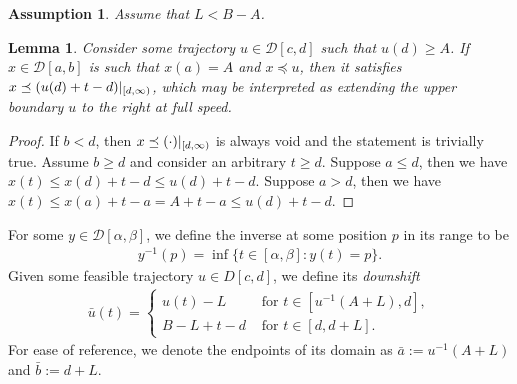\documentclass[a4paper]{article}
\theoremstyle{definition}
\theoremstyle{plain}
\newtheorem{lemma}{Lemma\hspace{0.25em}\ignorespaces}
\newtheorem{assump}{Assumption\hspace{0.25em}\ignorespaces}
\begin{document}
\begin{assump}\label{assump:L-bound}
  Assume that $L < B - A$.
\end{assump}

\begin{lemma}\label{lemma:boundary-extension}
  Consider some trajectory $u \in \mathcal{D}[c,d]$ such that $u(d) \geq A$. If
  $x \in \mathcal{D}[a,b]$ is such that $x(a) = A$ and $x \preceq u$, then it
  satisfies $x \preceq (u(d) + t - d)|_{[d,\infty)}$, which may be
  interpreted as extending the upper boundary $u$ to the right at full speed.
\end{lemma}
\begin{proof}
  If $b < d$, then $x \preceq (\cdot)|_{[d,\infty)}$ is always void and
  the statement is trivially true. Assume $b \geq d$ and consider an arbitrary
  $t \geq d$.
  Suppose $a \leq d$, then we have $x(t) \leq x(d) + t - d \leq u(d) + t - d$.
  Suppose $a > d$, then we have $x(t) \leq x(a) + t - a = A + t - a \leq u(d) + t - d$.
\end{proof}

For some $y \in \mathcal{D}[\alpha, \beta]$, we define the inverse at some position $p$ in
its range to be
\begin{align}
  y^{-1}(p) = \inf \{ t \in [\alpha, \beta] : y(t) = p\} .
\end{align}
%
Given some feasible trajectory $u \in D[c,d]$, we define its \emph{downshift}
%
\begin{align}
  \bar{u}(t) =
  \begin{cases}
    u(t) - L &\text{ for } t \in [u^{-1}(A + L), d] , \\
    B - L + t - d &\text{ for } t \in [d, d + L] .
  \end{cases}
\end{align}
For ease of reference, we denote the endpoints of its domain as
$\bar{a} := u^{-1}(A+L)$ and $\bar{b} := d + L$.
\end{document}
